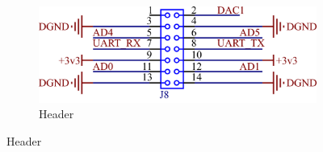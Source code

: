\documentclass[titlepage, 12pt]{article}
\begin{document}
    \begin{figure}[!htbp]
        \begin{subfigure}[b]{\textwidth}
            \centering
            \includegraphics[scale=1.1]{images/arm-header.png}
            \caption{Header}
            \label{fig:arm-header}
        \end{subfigure}


\end{figure}
\end{document}
